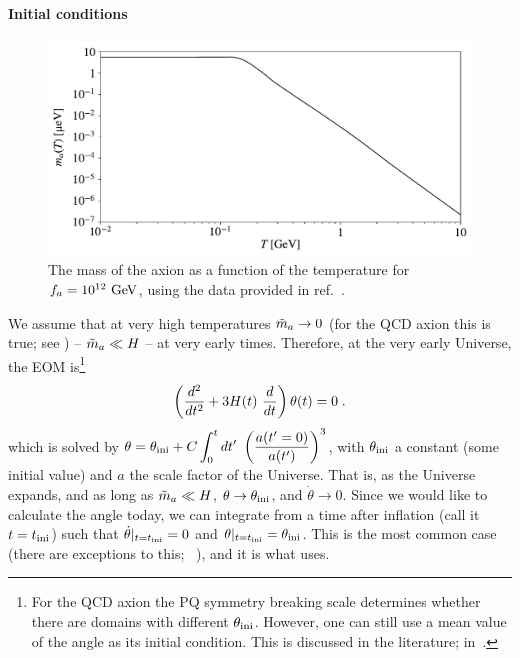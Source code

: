 \documentclass[11pt,a4paper]{article}
\begin{document}
\paragraph{Initial conditions}
%
\begin{figure}[h!]
	\includegraphics[width=1\textwidth]{axion_mass.pdf}
	\caption{The mass of the axion as a function of the temperature for $f_{a}{}=10^{12}~{\rm GeV}$, using the data provided in ref.~\cite{Borsanyi:2016ksw}.}
	\label{fig:axion_mass}
\end{figure}
%
We assume that at very high temperatures $\tilde m_{a}{} \to 0$ (for the QCD axion this is true; see ) -- \ie $\tilde m_{a}{} \ll H$ -- at very early times.  Therefore, at the very early Universe, the EOM is\footnote{For the QCD axion the PQ symmetry breaking scale determines whether there are domains with different $\theta_{\rm ini}{}$.  However, one can still use a mean value of the angle as its initial condition. This is discussed in the literature; \eg in~\cite{Preskill:1982cy,Visinelli:2009zm,Visinelli:2009kt}.}
%
\begin{equation}
	\lrb{\dfrac{d^2}{d t^2} + 3 H(t) \ \dfrac{d}{d t}  } \theta(t) = 0 \; .
	\label{eq:massless_eom}
\end{equation}
%
which is solved by $\theta = \theta_{\rm ini}{} + C \displaystyle \int_{0}^t d t' \ \left(  \dfrac{a(t'=0)}{a(t')}  \right)^3$, with $\theta_{\rm ini}{}$ a constant (some initial value) and $a$ the scale factor of the Universe. That is, as the Universe expands, and as long as $\tilde m_{a}{} \ll H$, $\theta \to \theta_{\rm ini}{}$, and $\dot \theta \to 0$. Since we would like to calculate the angle today, we can integrate  from a time after inflation (call it $t = t_{\rm ini}{}$) such that $ \dot \theta |_{t=t_{\rm ini}{}} = 0$ and  $\theta|_{t=t_{\rm ini}{}} = \theta_{\rm ini}{}$.   This is the most common case (there are exceptions to this; \eg~\cite{Co:2019jts}), and it is what \mimes uses.
\end{document}
